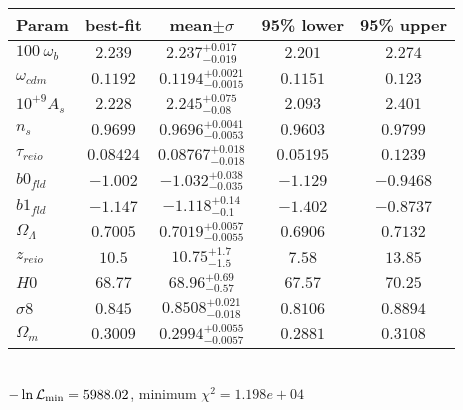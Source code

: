 \begin{tabular}{|l|c|c|c|c|} 
 \hline 
Param & best-fit & mean$\pm\sigma$ & 95\% lower & 95\% upper \\ \hline 
$100~\omega_{b }$ &$2.239$ & $2.237_{-0.019}^{+0.017}$ & $2.201$ & $2.274$ \\ 
$\omega_{cdm }$ &$0.1192$ & $0.1194_{-0.0015}^{+0.0021}$ & $0.1151$ & $0.123$ \\ 
$10^{+9}A_{s }$ &$2.228$ & $2.245_{-0.08}^{+0.075}$ & $2.093$ & $2.401$ \\ 
$n_{s }$ &$0.9699$ & $0.9696_{-0.0053}^{+0.0041}$ & $0.9603$ & $0.9799$ \\ 
$\tau_{reio }$ &$0.08424$ & $0.08767_{-0.018}^{+0.018}$ & $0.05195$ & $0.1239$ \\ 
$b0_{fld }$ &$-1.002$ & $-1.032_{-0.035}^{+0.038}$ & $-1.129$ & $-0.9468$ \\ 
$b1_{fld }$ &$-1.147$ & $-1.118_{-0.1}^{+0.14}$ & $-1.402$ & $-0.8737$ \\ 
$\Omega_{\Lambda }$ &$0.7005$ & $0.7019_{-0.0055}^{+0.0057}$ & $0.6906$ & $0.7132$ \\ 
$z_{reio }$ &$10.5$ & $10.75_{-1.5}^{+1.7}$ & $7.58$ & $13.85$ \\ 
$H0$ &$68.77$ & $68.96_{-0.57}^{+0.69}$ & $67.57$ & $70.25$ \\ 
$\sigma8$ &$0.845$ & $0.8508_{-0.018}^{+0.021}$ & $0.8106$ & $0.8894$ \\ 
$\Omega_{m }$ &$0.3009$ & $0.2994_{-0.0057}^{+0.0055}$ & $0.2881$ & $0.3108$ \\ 
\hline 
 \end{tabular} \\ 
$-\ln{\cal L}_\mathrm{min} =5988.02$, minimum $\chi^2=1.198e+04$ \\ 
